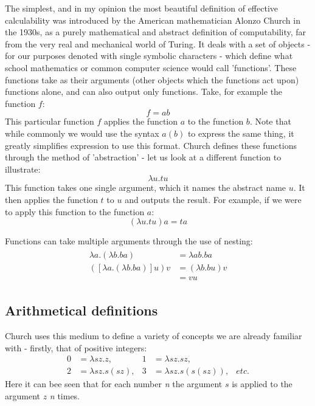\documentclass[Master.tex]{subfiles}
\begin{document}
The simplest, and in my opinion the most beautiful definition of effective calculability was introduced by the American mathematician Alonzo Church in the 1930s, as a purely mathematical and abstract definition of computability, far from the very real and mechanical world of Turing. It deals with a set of objects - for our purposes denoted with single symbolic characters - which define what school mathematics or common computer science would call 'functions'. These functions take as their arguments (other objects which the functions act upon) functions alone, and can also output only functions. Take, for example the function $f$:
\begin{equation*}
f = ab
\end{equation*}
This particular function $f$ applies the function $a$ to the function $b$. Note that while commonly we would use the syntax $a(b)$ to express the same thing, it greatly simplifies expression to use this format. Church defines these functions through the method of 'abstraction' - let us look at a different function to illustrate:
\begin{equation*}
\lambda u.tu
\end{equation*}
This function takes one single argument, which it names the abstract name $u$. It then applies the function $t$ to $u$ and outputs the result. For example, if we were to apply this function to the function $a$:
\begin{equation*}
(\lambda u.tu) a = ta	
\end{equation*}

Functions can take multiple arguments through the use of nesting:
\begin{gather*}
\begin{aligned}
\lambda a.(\lambda b.ba) &=  \lambda ab.ba \\
([\lambda a.(\lambda b.ba)]u)v &= (\lambda b.bu)v \\ &= vu
\end{aligned}
\end{gather*}

\subsection{Arithmetical definitions}

Church uses this medium to define a variety of concepts we are already familiar with - firstly, that of positive integers:
\begin{equation*}
\begin{aligned}
\bm{\mathrm{0}} &= \lambda sz.z,
  & %
\bm{\mathrm{1}} &= \lambda sz.sz,
  \\
\bm{\mathrm{2}} &= \lambda sz.s(sz),
  &
\bm{\mathrm{3}} &= \lambda sz.s(s(sz)),
  &
etc.
\end{aligned}
\end{equation*}
Here it can bee seen that for each number \textit{n} the argument $s$  is applied to the argument $z$ \textit{n} times.
\end{document}
